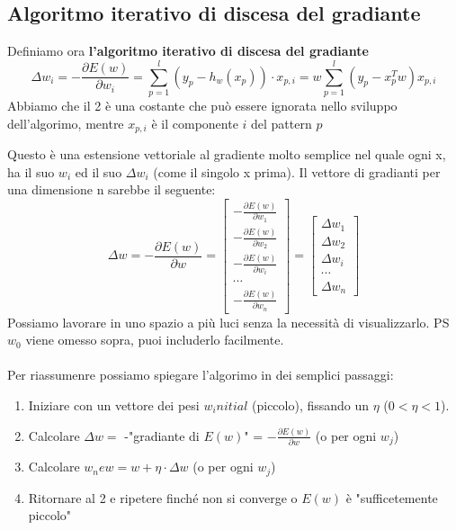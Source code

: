 \subsection{Algoritmo iterativo di discesa del gradiante}
\begin{definition}
    Definiamo ora \textbf{l'algoritmo iterativo di discesa del gradiante}
    $$\Delta w_i = -\frac{\partial E(w)}{\partial w_i} = \sum_{p=1}^{l}(y_p - h_w(x_p)) \cdot x_{p,i} = w\sum_{p=1}^{l}(y_p - x_p^T w)x_{p,i}$$
    Abbiamo che il 2 è una costante che può essere ignorata nello sviluppo dell'algorimo, mentre $x_{p,i}$ è il componente $i$ del pattern $p$
\end{definition}
\hspace{-15pt}Questo è una estensione vettoriale al gradiente molto semplice nel quale ogni x, ha il suo $w_i$ ed il suo $\Delta w_i$ (come il singolo x prima).
Il vettore di gradianti per una dimensione n sarebbe il seguente:
$$
\Delta w = -\frac{\partial E(w)}{\partial w} = 
\begin{bmatrix}
    -\frac{\partial E(w)}{\partial w_1}\\
    -\frac{\partial E(w)}{\partial w_2}\\
    -\frac{\partial E(w)}{\partial w_i}\\
    \cdots\\
    -\frac{\partial E(w)}{\partial w_n}
\end{bmatrix}
= 
\begin{bmatrix}
    \Delta w_1\\
    \Delta w_2\\
    \Delta w_i\\
    \cdots \\
    \Delta w_n
\end{bmatrix}
$$
Possiamo lavorare in uno spazio a più luci senza la necessità di visualizzarlo. PS $w_0$ viene omesso sopra, puoi includerlo facilmente.\\\\
Per riassumenre possiamo spiegare l'algorimo in dei semplici passaggi:
\begin{enumerate}
    \item Iniziare con un vettore dei pesi $w_initial$ (piccolo), fissando un $\eta$ ($0 < \eta < 1$).
    \item Calcolare $\Delta w =$ -"gradiante di $E(w)$" = $-\frac{\partial E(w)}{\partial w}$ (o per ogni $w_j$)
    \item Calcolare $w_new = w + \eta \cdot \Delta w$ (o per ogni $w_j$) 
    \item Ritornare al 2 e ripetere finché non si converge o $E(w)$ è "sufficetemente piccolo"
\end{enumerate}
